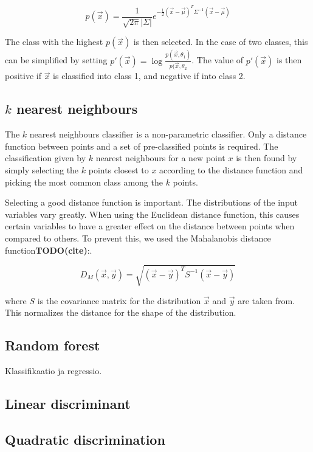 \documentclass[twoside]{article}
\newcommand{\todo}[1]{\textbf{TODO(#1)}}
\renewcommand{\v}[1]{\vec{#1}}
\begin{document}
\begin{multicols}{2}
\begin{equation}
 p(\v{x}) = \frac{1}{\sqrt{2\pi} |\Sigma|}e^{-\frac{1}{2}(\v{x}-\v{\mu})^T \Sigma^{-1} (\v{x}-\v{\mu})}
\end{equation}

The class with the highest $p(\v{x})$ is then selected. In the case of two classes,
this can be simplified by setting
$p'(\v{x}) = \log \frac{p(\v{x},\theta_1)}{p(\v{x},\theta_2}$.
The value of $p'(\v{x})$ is then positive if $\v{x}$ is classified into class 1,
and negative if into class 2. 

\subsection{$k$ nearest neighbours}

The $k$ nearest neighbours classifier is a non-parametric classifier. Only a
distance function between points and a set of pre-classified points is required.
The classification given by $k$ nearest neighbours for a new point $x$ is then found by simply
selecting the $k$ points closest to $x$ according to the distance function and
picking the most common class among the $k$ points.

Selecting a good distance function is important. The distributions of the
input variables vary greatly. When using the Euclidean distance function,
this causes certain variables to have a greater effect on the distance between
points when compared to others. To prevent this, we used the Mahalanobis
distance function\todo{cite}:.

\begin{equation}\label{eq:mahalanobis}
  D_M(\v{x}, \v{y}) = \sqrt{(\v{x}-\v{y})^T S^{-1} (\v{x}-\v{y})}
\end{equation}

where $S$ is the covariance matrix for the 
distribution $\v{x}$ and $\v{y}$ are taken from.
This normalizes the distance for the shape of the distribution.

\subsection{Random forest}

Klassifikaatio ja regressio.

\subsection{Linear discriminant}

\subsection{Quadratic discrimination}


\end{multicols}
\end{document}

